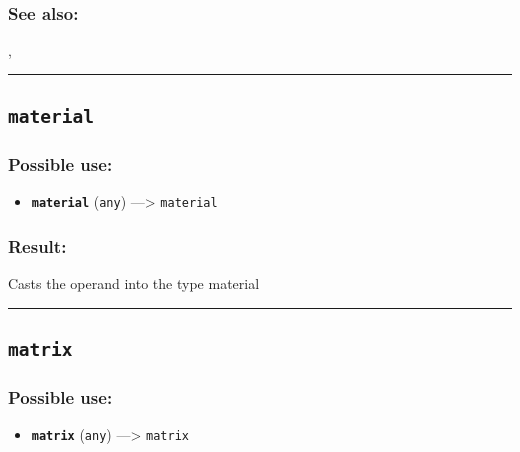 \documentclass[]{book}
\providecommand{\tightlist}{%
  \setlength{\itemsep}{0pt}\setlength{\parskip}{0pt}}
\theoremstyle{definition}
\theoremstyle{definition}
\theoremstyle{definition}
\theoremstyle{remark}
\begin{document}
\begin{verbatim}
 
\end{verbatim}

\subsubsection{See also:}\label{see-also-132}

\href{OperatorsSZ\#}{},

\begin{center}\rule{0.5\linewidth}{\linethickness}\end{center}

\subsection{\texorpdfstring{\texttt{material}}{material}}\label{material-5}

\subsubsection{Possible use:}\label{possible-use-336}

\begin{itemize}
\tightlist
\item
  \textbf{\texttt{material}} (\texttt{any}) ---\textgreater{}
  \texttt{material}
\end{itemize}

\subsubsection{Result:}\label{result-325}

Casts the operand into the type material

\begin{center}\rule{0.5\linewidth}{\linethickness}\end{center}

\subsection{\texorpdfstring{\texttt{matrix}}{matrix}}\label{matrix}

\subsubsection{Possible use:}\label{possible-use-337}

\begin{itemize}
\tightlist
\item
  \textbf{\texttt{matrix}} (\texttt{any}) ---\textgreater{}
  \texttt{matrix}
\end{itemize}
\end{document}

